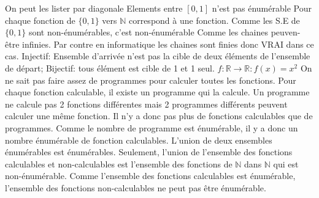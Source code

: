 \begin{mcqs}
  {On peut les lister par diagonale}
  {}
  {}
  {Elements entre $[0,1]$ n'est pas énumérable}
  {Pour chaque fonction de $\{0,1\}$ vers $\mathbb{N}$ correspond à une fonction. Comme les S.E de $\{0,1\}$ sont non-énumérables, c'est non-énumérable}
  {}
  {Comme les chaines peuven-être infinies. Par contre en informatique les chaines sont finies donc VRAI dans ce cas.}
  {Injectif: Ensemble d'arrivée n'est pas la cible de deux éléments de l'ensemble de départ; Bijectif: tous élément est cible de 1 et 1 seul.}
  {$f:\mathbb{R}\rightarrow\mathbb{R} : f(x)=x^{2}$}
  {}
  {}
  {}
  {}
  {}
  {On ne sait pas faire assez de programmes pour calculer toutes les fonctions.}
  {Pour chaque fonction calculable, il existe un programme qui la calcule.
  Un programme ne calcule pas 2 fonctions différentes mais 2 programmes différents peuvent calculer une même fonction.
  Il n'y a donc pas plus de fonctions calculables que de programmes.
  Comme le nombre de programme est énumérable,
  il y a donc un nombre énumérable de fonction calculables.}
  {L'union de deux ensembles énumérables est énumérables.
  Seulement, l'union de l'ensemble des fonctions calculables et non-calculables
  est l'ensemble des fonctions de $\mathbb{N}$ dans $\mathbb{N}$ qui est non-énumérable.
  Comme l'ensemble des fonctions calculables est énumérable,
  l'ensemble des fonctions non-calculables ne peut pas être énumérable.}
\end{mcqs}
